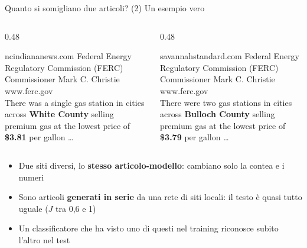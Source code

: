 \documentclass[aspectratio=169]{beamer}
\newcommand{\hl}[1]{\textbf{#1}}
\begin{document}
\begin{frame}{Quanto si somigliano due articoli? (2) Un esempio vero}
  \begin{columns}[t]
    \begin{column}{0.48\textwidth}
      \begin{block}{\footnotesize ncindiananews.com}
        \scriptsize Federal Energy Regulatory Commission (FERC) Commissioner Mark C. Christie \textbar{} www.ferc.gov\\[0.3em]
        There was a single gas station in cities across \hl{White County} selling premium gas at the lowest price of \hl{\$3.81} per gallon \dots
      \end{block}
    \end{column}
    \begin{column}{0.48\textwidth}
      \begin{block}{\footnotesize savannahstandard.com}
        \scriptsize Federal Energy Regulatory Commission (FERC) Commissioner Mark C. Christie \textbar{} www.ferc.gov\\[0.3em]
        There were two gas stations in cities across \hl{Bulloch County} selling premium gas at the lowest price of \hl{\$3.79} per gallon \dots
      \end{block}
    \end{column}
  \end{columns}
  \vspace{0.6em}
  \begin{itemize}[<+->]
    \setlength\itemsep{0.5em}
    \item Due siti diversi, lo \hl{stesso articolo-modello}: cambiano solo la contea e i numeri
    \item Sono articoli \hl{generati in serie} da una rete di siti locali: il testo \`e quasi tutto uguale ($J$ tra 0,6 e 1)
    \item Un classificatore che ha visto uno di questi nel training riconosce subito l'altro nel test
  \end{itemize}
\end{frame}
\end{document}
